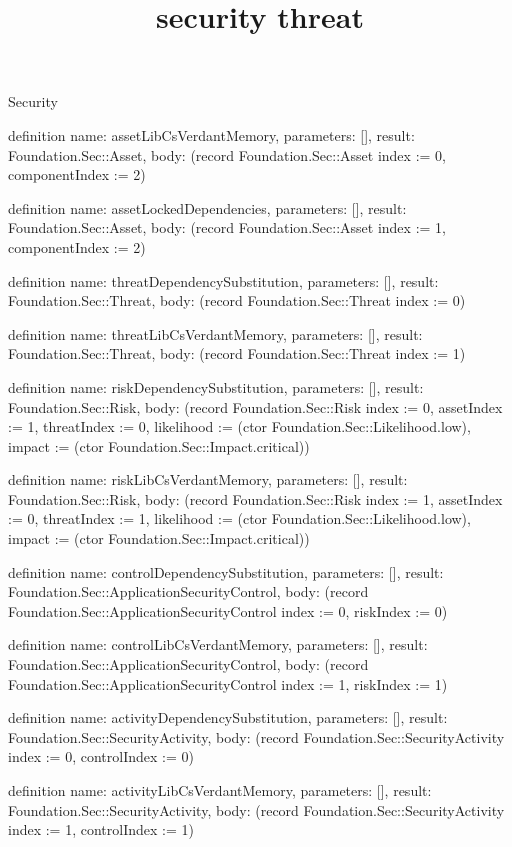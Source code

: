 \begin{lexlean}{Security}
\title{security threat}
\begin{semanticmodule}
definition{
  name: assetLibCsVerdantMemory,
  parameters: [],
  result: Foundation.Sec::Asset,
  body: (record Foundation.Sec::Asset {index := 0, componentIndex := 2})
}

definition{
  name: assetLockedDependencies,
  parameters: [],
  result: Foundation.Sec::Asset,
  body: (record Foundation.Sec::Asset {index := 1, componentIndex := 2})
}

definition{
  name: threatDependencySubstitution,
  parameters: [],
  result: Foundation.Sec::Threat,
  body: (record Foundation.Sec::Threat {index := 0})
}

definition{
  name: threatLibCsVerdantMemory,
  parameters: [],
  result: Foundation.Sec::Threat,
  body: (record Foundation.Sec::Threat {index := 1})
}

definition{
  name: riskDependencySubstitution,
  parameters: [],
  result: Foundation.Sec::Risk,
  body: (record Foundation.Sec::Risk {index := 0, assetIndex := 1, threatIndex := 0, likelihood := (ctor Foundation.Sec::Likelihood.low), impact := (ctor Foundation.Sec::Impact.critical)})
}

definition{
  name: riskLibCsVerdantMemory,
  parameters: [],
  result: Foundation.Sec::Risk,
  body: (record Foundation.Sec::Risk {index := 1, assetIndex := 0, threatIndex := 1, likelihood := (ctor Foundation.Sec::Likelihood.low), impact := (ctor Foundation.Sec::Impact.critical)})
}

definition{
  name: controlDependencySubstitution,
  parameters: [],
  result: Foundation.Sec::ApplicationSecurityControl,
  body: (record Foundation.Sec::ApplicationSecurityControl {index := 0, riskIndex := 0})
}

definition{
  name: controlLibCsVerdantMemory,
  parameters: [],
  result: Foundation.Sec::ApplicationSecurityControl,
  body: (record Foundation.Sec::ApplicationSecurityControl {index := 1, riskIndex := 1})
}

definition{
  name: activityDependencySubstitution,
  parameters: [],
  result: Foundation.Sec::SecurityActivity,
  body: (record Foundation.Sec::SecurityActivity {index := 0, controlIndex := 0})
}

definition{
  name: activityLibCsVerdantMemory,
  parameters: [],
  result: Foundation.Sec::SecurityActivity,
  body: (record Foundation.Sec::SecurityActivity {index := 1, controlIndex := 1})
}


\end{semanticmodule}
\end{lexlean}
